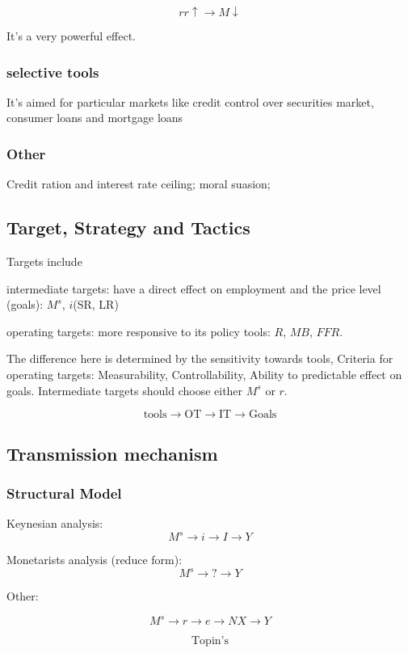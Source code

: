 \documentclass[10pt, a4paper]{article}
\begin{document}
        $$rr\uparrow \rightarrow M \downarrow $$

        It's a very powerful effect.

        \subsubsection{selective tools} 
        
        It's aimed for particular markets like credit control over securities market, consumer loans and mortgage loans 

        \subsubsection{Other}

        Credit ration and interest rate ceiling; moral suasion;

    \subsection{Target, Strategy and Tactics}
            Targets include 
            
            \quad intermediate targets: have  a direct effect on employment and the price level (goals): $M^s$, $i$(SR, LR)
 
            \quad operating targets: more responsive to its policy tools: $R$, $MB$, $FFR$.
            
            The difference here is determined by the sensitivity towards tools, Criteria for operating targets: Measurability, Controllability, Ability to predictable effect on goals. Intermediate targets should choose either $M^s$ or $r$. 

            $$\text{tools} \rightarrow \text{OT} \rightarrow \text{IT} \rightarrow \text{Goals}$$

    \subsection{Transmission mechanism}
        \subsubsection{Structural Model}
            Keynesian analysis:
            $$M^s \rightarrow i \rightarrow I \rightarrow Y$$

            Monetarists analysis (reduce form):
            $$M^s \rightarrow ? \rightarrow Y$$

            Other: 

            $$M^s \rightarrow r  \rightarrow e \rightarrow NX  \rightarrow Y $$

            $$\text{Topin's}$$

            $$$$
\end{document}
